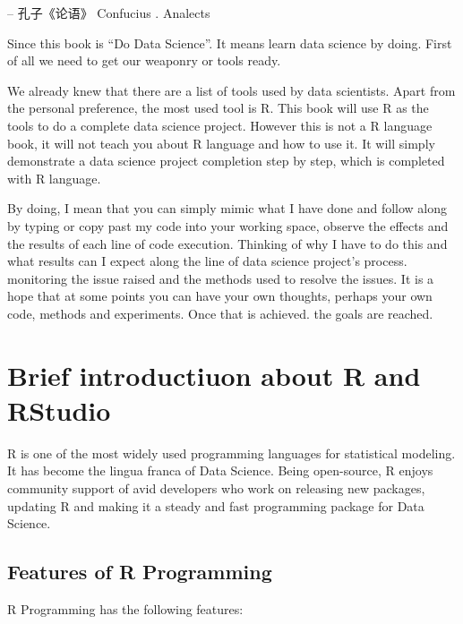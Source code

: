 \documentclass[
]{book}
\begin{document}
-- 孔子《论语》
Confucius . Analects

Since this book is ``Do Data Science''. It means learn data science by doing. First of all we need to get our weaponry or tools ready.

We already knew that there are a list of tools used by data scientists. Apart from the personal preference, the most used tool is R. This book will use R as the tools to do a complete data science project. However this is not a R language book, it will not teach you about R language and how to use it. It will simply demonstrate a data science project completion step by step, which is completed with R language.

By doing, I mean that you can simply mimic what I have done and follow along by typing or copy past my code into your working space, observe the effects and the results of each line of code execution. Thinking of why I have to do this and what results can I expect along the line of data science project's process. monitoring the issue raised and the methods used to resolve the issues. It is a hope that at some points you can have your own thoughts, perhaps your own code, methods and experiments. Once that is achieved. the goals are reached.

\hypertarget{brief-introductiuon-about-r-and-rstudio}{%
\section{Brief introductiuon about R and RStudio}\label{brief-introductiuon-about-r-and-rstudio}}

R is one of the most widely used programming languages for statistical modeling. It has become the lingua franca of Data Science. Being open-source, R enjoys community support of avid developers who work on releasing new packages, updating R and making it a steady and fast programming package for Data Science.

\hypertarget{features-of-r-programming}{%
\subsection{Features of R Programming}\label{features-of-r-programming}}

R Programming has the following features:
\end{document}
